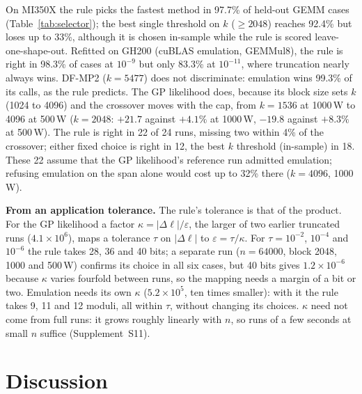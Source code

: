 \documentclass[conference]{IEEEtran}
\newcommand{\W}{\,W}
\newcommand{\ee}[2]{#1{\times}10^{#2}}  %
\newcommand{\pct}{\%}
\begin{document}
On MI350X the rule picks the fastest method in 97.7\pct{} of held-out GEMM cases (Table~\ref{tab:selector}); the best
single threshold on $k$ ($\ge2048$) reaches 92.4\pct{} but loses up to 33\pct, although it is chosen in-sample while the
rule is scored leave-one-shape-out. Refitted on GH200 (cuBLAS emulation, GEMMul8), the rule is right in 98.3\pct{} of
cases at $10^{-9}$ but only 83.3\pct{} at $10^{-11}$, where truncation nearly always wins. DF-MP2 ($k=5477$) does not
discriminate: emulation wins 99.3\pct{} of its calls, as the rule predicts. The GP likelihood does, because its block size
sets $k$ (1024 to 4096) and the crossover moves with the cap, from $k=1536$ at 1000\W{} to 4096 at 500\W{} ($k=2048$:
$+21.7$ against $+4.1\pct$ at 1000\W, $-19.8$ against $+8.3\pct$ at 500\W). The rule is right in 22 of 24 runs, missing
two within 4\pct{} of the crossover; either fixed choice is right in 12, the best $k$ threshold (in-sample) in 18. These 22 assume that the GP likelihood's reference
run admitted emulation; refusing emulation on the span alone would cost up to 32\pct{} there ($k=4096$, 1000\W).

\textbf{From an application tolerance.} The rule's tolerance is that of the product. For the GP likelihood a factor
$\kappa=|\Delta\ell|/\varepsilon$, the larger of two earlier truncated runs ($\ee{4.1}{6}$), maps a tolerance $\tau$ on
$|\Delta\ell|$ to $\varepsilon=\tau/\kappa$. For $\tau=10^{-2}$, $10^{-4}$ and $10^{-6}$ the rule takes 28, 36 and 40 bits; a
separate run ($n=64000$, block 2048, 1000 and 500\W) confirms its choice in all six cases, but 40 bits gives
$\ee{1.2}{-6}$ because $\kappa$ varies fourfold between runs, so the mapping needs a margin of a bit or two. Emulation
needs its own $\kappa$ ($\ee{5.2}{5}$, ten times smaller): with it the rule takes 9, 11 and 12 moduli, all within $\tau$,
without changing its choices. $\kappa$ need not come from full runs: it grows roughly linearly with $n$, so runs of a few
seconds at small $n$ suffice (Supplement~S11).

\section{Discussion}\label{sec:discussion}
\end{document}
